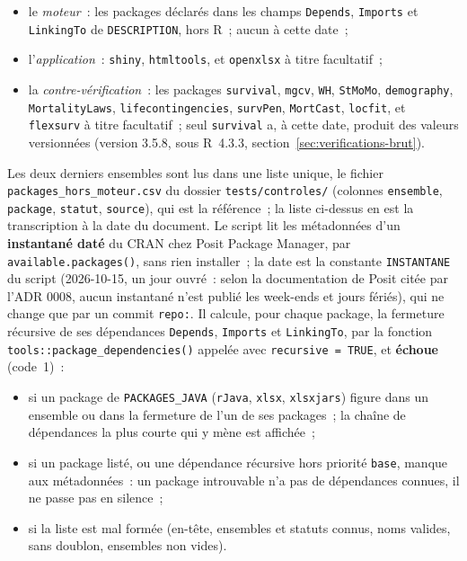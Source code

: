 \documentclass[a4paper,11pt]{article}
\newcommand{\code}[1]{\texttt{\small #1}}
\begin{document}
\begin{itemize}[leftmargin=*, itemsep=2pt]
  \item le \emph{moteur}~: les packages déclarés dans les champs \code{Depends},
    \code{Imports} et \code{LinkingTo} de \code{DESCRIPTION}, hors R~; aucun à
    cette date~;
  \item l'\emph{application}~: \code{shiny}, \code{htmltools}, et
    \code{openxlsx} à titre facultatif~;
  \item la \emph{contre-vérification}~: les packages \code{survival},
    \code{mgcv}, \code{WH}, \code{StMoMo}, \code{demography}, \code{MortalityLaws},
    \code{lifecontingencies}, \code{survPen}, \code{MortCast}, \code{locfit}, et
    \code{flexsurv} à titre facultatif~; seul \code{survival} a, à cette
    date, produit des valeurs versionnées (version 3.5.8, sous R~4.3.3,
    section~\ref{sec:verifications-brut}).
\end{itemize}

\noindent
Les deux derniers ensembles sont lus dans une liste unique, le fichier
\code{packages\_hors\_moteur.csv} du dossier \code{tests/controles/} (colonnes \code{ensemble},
\code{package}, \code{statut}, \code{source}), qui est la référence~; la liste
ci-dessus en est la transcription à la date du document. Le script lit les
métadonnées d'un \textbf{instantané daté} du CRAN chez Posit Package Manager,
par \code{available.packages()}, sans rien installer~; la date est la constante
\code{INSTANTANE} du script (2026-10-15, un jour ouvré~: selon la documentation de Posit citée par
l'ADR 0008, aucun instantané n'est publié les week-ends et jours fériés), qui ne change que par un commit
\code{repo:}. Il calcule, pour chaque package, la fermeture récursive de ses
dépendances \code{Depends}, \code{Imports} et \code{LinkingTo}, par la
fonction \code{tools::package\_dependencies()} appelée avec
\code{recursive = TRUE}, et \textbf{échoue} (code~1)~:

\begin{itemize}[leftmargin=*, itemsep=2pt]
  \item si un package de \code{PACKAGES\_JAVA} (\code{rJava}, \code{xlsx},
    \code{xlsxjars}) figure dans un ensemble ou dans la fermeture de l'un de ses
    packages~; la chaîne de dépendances la plus courte qui y mène est
    affichée~;
  \item si un package listé, ou une dépendance récursive hors priorité
    \code{base}, manque aux métadonnées~: un package introuvable n'a pas de
    dépendances connues, il ne passe pas en silence~;
  \item si la liste est mal formée (en-tête, ensembles et statuts connus, noms
    valides, sans doublon, ensembles non vides).
\end{itemize}
\end{document}
